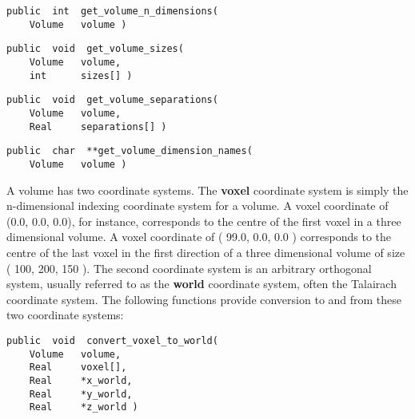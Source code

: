 
{\bf\begin{verbatim}
public  int  get_volume_n_dimensions(
    Volume   volume )
\end{verbatim}}


{\bf\begin{verbatim}
public  void  get_volume_sizes(
    Volume   volume,
    int      sizes[] )
\end{verbatim}}


{\bf\begin{verbatim}
public  void  get_volume_separations(
    Volume   volume,
    Real     separations[] )
\end{verbatim}}


{\bf\begin{verbatim}
public  char  **get_volume_dimension_names(
    Volume   volume )
\end{verbatim}}


A volume has two coordinate systems.  The {\bf voxel} coordinate
system is simply the n-dimensional indexing coordinate system for a
volume.  A voxel coordinate of (0.0, 0.0, 0.0), for instance, corresponds
to the centre of the first voxel in a three dimensional volume.  A voxel
coordinate of ( 99.0, 0.0, 0.0 ) corresponds to the centre of the last
voxel in the first direction of a three dimensional volume of size (
100, 200, 150 ).  The second coordinate system is an arbitrary orthogonal
system, usually referred to as the {\bf world} coordinate system, often
the Talairach coordinate system.  The following functions provide
conversion to and from these two coordinate systems:

{\bf\begin{verbatim}
public  void  convert_voxel_to_world(
    Volume   volume,
    Real     voxel[],
    Real     *x_world,
    Real     *y_world,
    Real     *z_world )
\end{verbatim}}

